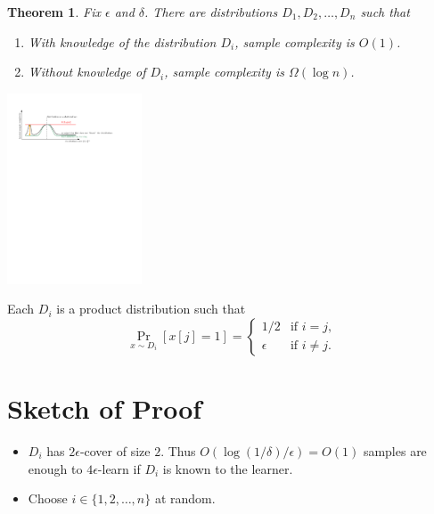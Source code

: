 \documentclass[30pt,landscape]{sciposter}
\newtheorem*{theorem}{Theorem}
\begin{document}
\begin{multicols}{3}
\begin{theorem}
Fix $\epsilon$ and $\delta$. There are distributions $D_1, D_2, \dots, D_n$ such that
\begin{enumerate}
\item With knowledge of the distribution $D_i$, sample complexity is $O(1)$.
\item Without knowledge of $D_i$, sample complexity is $\Omega(\log n)$.
\end{enumerate}
\end{theorem}

\vspace{1cm}

\begin{center}
\includegraphics[width=0.3\textwidth]{figure-2}
\end{center}

\vspace{1cm}


Each $D_i$ is a product distribution such that
$$
\Pr_{x \sim D_i}[x[j] = 1] =
\begin{cases}
1/2 & \text{if $i = j$,} \\
\epsilon & \text{if $i \neq j$.}
\end{cases}
$$

\columnbreak

\section*{Sketch of Proof}

\begin{itemize}
\item $D_i$ has $2\epsilon$-cover of size $2$. Thus $O(\log(1/\delta)/\epsilon) = O(1)$
samples are enough to $4\epsilon$-learn if $D_i$ is known to the learner.

\vspace{1cm}

\item Choose $i \in \{1,2,\dots,n\}$ at random.


\end{itemize}
\end{multicols}
\end{document}
